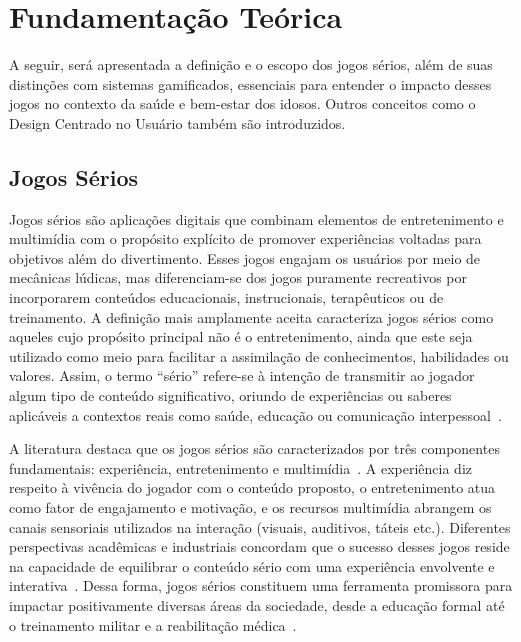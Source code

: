 \chapter{Fundamentação Teórica}
\label{cap:fundamentacao_teorica}

A seguir, será apresentada a definição e o escopo dos jogos sérios, além de suas distinções com sistemas gamificados, essenciais para entender o impacto desses jogos no contexto da saúde e bem-estar dos idosos. Outros conceitos como o Design Centrado no Usuário também são introduzidos.

\section{Jogos Sérios}

Jogos sérios são aplicações digitais que combinam elementos de entretenimento e multimídia com o propósito explícito de promover experiências voltadas para objetivos além do divertimento. Esses jogos engajam os usuários por meio de mecânicas lúdicas, mas diferenciam-se dos jogos puramente recreativos por incorporarem conteúdos educacionais, instrucionais, terapêuticos ou de treinamento. A definição mais amplamente aceita caracteriza jogos sérios como aqueles cujo propósito principal não é o entretenimento, ainda que este seja utilizado como meio para facilitar a assimilação de conhecimentos, habilidades ou valores. Assim, o termo “sério” refere-se à intenção de transmitir ao jogador algum tipo de conteúdo significativo, oriundo de experiências ou saberes aplicáveis a contextos reais como saúde, educação ou comunicação interpessoal~\cite{laamarti2014overview}.

A literatura destaca que os jogos sérios são caracterizados por três componentes fundamentais: experiência, entretenimento e multimídia~\cite{laamarti2014overview}. A experiência diz respeito à vivência do jogador com o conteúdo proposto, o entretenimento atua como fator de engajamento e motivação, e os recursos multimídia abrangem os canais sensoriais utilizados na interação (visuais, auditivos, táteis etc.). Diferentes perspectivas acadêmicas e industriais concordam que o sucesso desses jogos reside na capacidade de equilibrar o conteúdo sério com uma experiência envolvente e interativa~\cite{nazry2017mood}. Dessa forma, jogos sérios constituem uma ferramenta promissora para impactar positivamente diversas áreas da sociedade, desde a educação formal até o treinamento militar e a reabilitação médica~\cite{michael2005serious, canapa2025interactive}.

